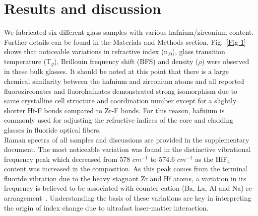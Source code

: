 \documentclass[11pt]{article}
\begin{document}
\section{Results and discussion}\label{sec: R&D}
We fabricated six different glass samples with various hafnium/zirconium content. Further details can be found in the Materials and Methods section. Fig.~\ref{Fig-1} shows that noticeable variations in refractive index (n$_D$), glass transition temperature (T$_g$), Brillouin frequency shift (BFS) and density ($\rho$) were observed in these bulk glasses. It should be noted at this point that there is a large chemical similarity between the hafnium and zirconium atoms and all reported fluorozirconates and fluorohafnates demonstrated strong isomorphism due to same crystalline cell structure and coordination number except for a slightly shorter Hf-F bonds compared to Zr-F bonds. For this reason, hafnium is commonly used for adjusting the refractive indices of the core and cladding glasses in fluoride optical fibers.
\\Raman spectra of all samples and discussions are provided in the supplementary document. The most noticeable variation was found in the distinctive vibrational frequency peak which decreased from 578 $cm^{-1}$ to 574.6 $cm^{-1}$ as the HfF$_4$ content was increased in the composition. As this peak comes from the terminal fluoride vibration due to the heavy stagnant Zr and Hf atoms, a variation in its frequency is believed to be associated with counter cation (Ba, La, Al and Na) re-arrangement~\cite{Phifer91,Gross13}. Understanding the basis of these variations are key in interpreting the origin of index change due to ultrafast laser-matter interaction. 
\end{document}
